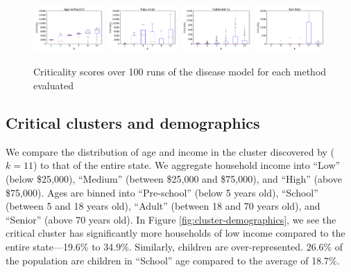 \begin{figure}
\centering
\includegraphics[width=0.24\textwidth]{img/mn_criticality_cluster_boxplot.pdf}
\includegraphics[width=0.24\textwidth]{img/mn_popsize_cluster_boxplot.pdf}
\includegraphics[width=0.24\textwidth]{img/mn_avg_blkgrp_cluster_boxplot.pdf}
\includegraphics[width=0.24\textwidth]{img/mn_random_blkgrp_cluster_boxplot.pdf}
\vspace{-.15in}
\caption{Criticality scores over 100 runs of the disease model for each method evaluated}
\label{fig:crit-boxplots}
\end{figure}

\subsection{Critical clusters and demographics}
\label{sec:demographics}
We compare the distribution of age and income in the cluster discovered by \algomaxcrit{} ($k=11$) to that of the entire state. We aggregate household income into ``Low'' (below \$25,000), ``Medium'' (between \$25,000 and \$75,000), and ``High'' (above \$75,000). Ages are binned into ``Pre-school'' (below 5 years old), ``School'' (between 5 and 18 years old), ``Adult'' (between 18 and 70 years old), and ``Senior'' (above 70 years old). In Figure \ref{fig:cluster-demographics}, we see the critical cluster has significantly more households of low income compared to the entire state---19.6\% to 34.9\%. Similarly, children are over-represented. 26.6\% of the population are children in ``School'' age compared to the average of 18.7\%.

